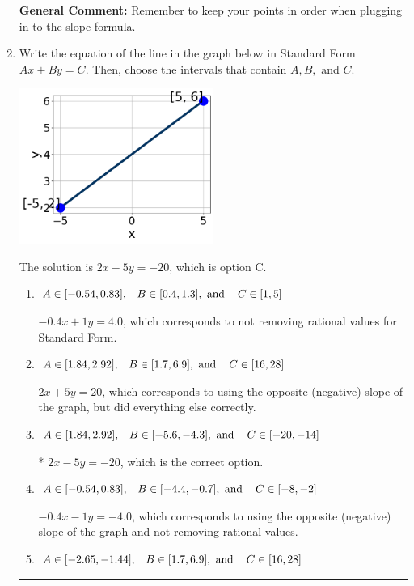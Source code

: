 \documentclass{extbook}[14pt]
\newcommand{\litem}[1]{\item #1

\rule{\textwidth}{0.4pt}}
\begin{document}
\begin{enumerate}
{\textbf{General Comment:} Remember to keep your points in order when plugging in to the slope formula.
}
\litem{
Write the equation of the line in the graph below in Standard Form $Ax+By=C$. Then, choose the intervals that contain $A, B, \text{ and } C$.

\begin{center}
    \includegraphics[width=0.5\textwidth]{../Figures/linearGraphToStandardCopyA.png}
\end{center}


The solution is \( 2x - 5y = -20 \), which is option C.\begin{enumerate}[label=\Alph*.]
\item \( A \in [-0.54, 0.83], \hspace{3mm} B \in [0.4, 1.3], \text{ and } \hspace{3mm} C \in [1, 5] \)

 $-0.4x + 1y = 4.0$, which corresponds to not removing rational values for Standard Form.
\item \( A \in [1.84, 2.92], \hspace{3mm} B \in [1.7, 6.9], \text{ and } \hspace{3mm} C \in [16, 28] \)

 $2x + 5y = 20$, which corresponds to using the opposite (negative) slope of the graph, but did everything else correctly.
\item \( A \in [1.84, 2.92], \hspace{3mm} B \in [-5.6, -4.3], \text{ and } \hspace{3mm} C \in [-20, -14] \)

* $2x - 5y = -20$, which is the correct option.
\item \( A \in [-0.54, 0.83], \hspace{3mm} B \in [-4.4, -0.7], \text{ and } \hspace{3mm} C \in [-8, -2] \)

 $-0.4x - 1y = -4.0$, which corresponds to using the opposite (negative) slope of the graph and not removing rational values.
\item \( A \in [-2.65, -1.44], \hspace{3mm} B \in [1.7, 6.9], \text{ and } \hspace{3mm} C \in [16, 28] \)


\end{enumerate}}
\end{enumerate}
\end{document}
